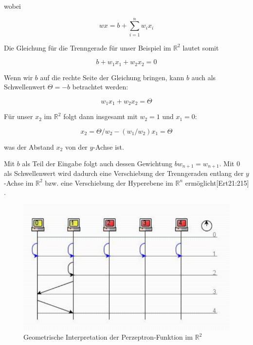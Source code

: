 \noindent
wobei

\begin{equation}
wx = b + \sum^n_{i=1} w_ix_i
\label{eq:gl-net}
\end{equation}

\noindent
Die Gleichung für die Trenngerade für unser Beispiel im $\mathbb{R}^2$ lautet somit

\begin{equation}
b + w_1x_1 + w_2x_2 = 0
\end{equation}

\noindent
Wenn wir $b$ auf die rechte Seite der Gleichung bringen, kann $b$ auch als Schwellenwert $\Theta = -b$ betrachtet werden:

\begin{equation}
w_1x_1 + w_2x_2 = \Theta
\end{equation}

\noindent
Für unser $x_2$ im $ \mathbb{R}^2$ folgt dann insgesamt mit $w_2 = 1$ und $x_1 = 0$:

\begin{equation}
x_2 = \Theta/w_2 -(w_1/w_2)x_1  = \Theta
\end{equation}

\noindent
was der Abstand $x_2$ von der $y$-Achse ist.

\noindent
Mit $b$ als Teil der Eingabe folgt auch dessen Gewichtung $bw_{n+1} = w_{n+1}$.
Mit $0$ als Schwellenwert wird dadurch eine Verschiebung der Trenngeraden entlang der $y$-Achse im $ \mathbb{R}^2$ bzw. eine Verschiebung der Hyperebene im $ \mathbb{R}^n$ ermöglicht[Ert21:215] \footnotemark[30].

\begin{figure}[h]
    \centering
    \includegraphics{images/p1ReadSeq.pdf}
    \caption{Geometrische Interpretation der Perzeptron-Funktion im $\mathbb{R}^2$}
    \label{fig-geominterpretation}
\end{figure}


